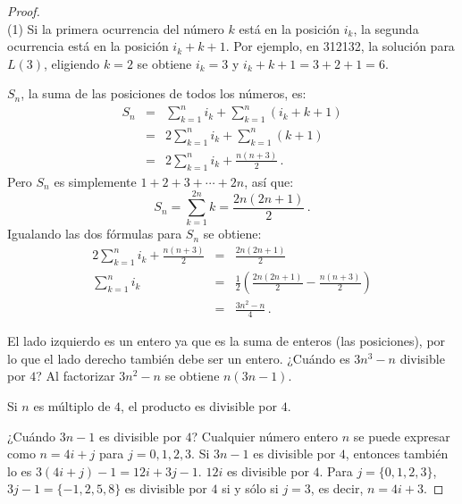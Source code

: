\begin{proof}
\mbox{}\\
(1)
Si la primera ocurrencia del número $k$ está en la posición $i_k$, la segunda ocurrencia está en la posición $i_k+k+1$. Por ejemplo, en 3{}1{}2{}1{}3{}2, la solución para $L(3)$, eligiendo $k=2$ se obtiene $i_k=3$ y $i_k+k+1=3+2+1=6$.

$S_n$, la suma de las posiciones de todos los números, es:
\begin{eqnarray*}
S_n&=&\sum_{k=1}^{n}i_k+\sum_{k=1}^{n}(i_k+k+1)\\
& =& 2\sum_{k=1}^{n}i_k+\sum_{k=1}^{n}(k+1)\\
&=& 2\sum_{k=1}^{n}i_k+\frac{n(n+3)}{2}\,.
\end{eqnarray*}
Pero $S_n$ es simplemente $1+2+3+\cdots+2n$, así que:
\[
S_n=\sum_{k=1}^{2n}k = \frac{2n(2n+1)}{2}\,.
\]
Igualando las dos fórmulas para $S_n$ se obtiene:
\begin{eqnarray*}
2\sum_{k=1}^{n}i_k+\frac{n(n+3)}{2} &=& \frac{2n(2n+1)}{2}\\
\sum_{k=1}^{n}i_k &=& \frac{1}{2}\left(\frac{2n(2n+1)}{2} - \frac{n(n+3)}{2}\right) \\
&=& \frac{3n^2-n}{4}\,.
\end{eqnarray*}

El lado izquierdo es un entero ya que es la suma de enteros (las posiciones), por lo que el lado derecho también debe ser un entero. ¿Cuándo es $3n^3-n$ divisible por $4$? Al factorizar $3n^2-n$ se obtiene $n(3n-1)$.

Si $n$ es múltiplo de $4$, el producto es divisible por $4$.

¿Cuándo $3n-1$ es divisible por $4$? Cualquier número entero $n$ se puede expresar como $n=4i+j$ para $j=0,1,2,3$. Si $3n-1$ es divisible por $4$, entonces también lo es $3(4i+j)-1 = 12i+3j-1$. $12i$ es divisible por $4$. Para $j=\{0,1,2,3\}$, $3j-1=\{-1,2,5,8\}$ es divisible por $4$ si y sólo si $j=3$, es decir, $n=4i+3$.
\end{proof}

